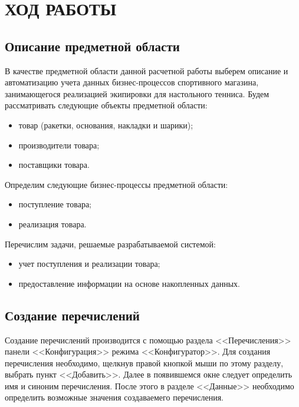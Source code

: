 \section[Ход работы]{ХОД РАБОТЫ}

\subsection{Описание предметной области}

В качестве предметной области данной расчетной работы выберем
описание и автоматизацию учета данных бизнес-процессов спортивного магазина,
занимающегося реализацией экипировки для настольного тенниса.
Будем рассматривать следующие объекты предметной области:
\begin{itemize}
\item товар (ракетки, основания, накладки и шарики);
\item производители товара;
\item поставщики товара.
\end{itemize}

Определим следующие бизнес-процессы предметной области:
\begin{itemize}
\item поступление товара;
\item реализация товара.
\end{itemize}

Перечислим задачи, решаемые разрабатываемой системой:
\begin{itemize}
\item учет поступления и реализации товара;
\item предоставление информации на основе накопленных данных.
\end{itemize}

\subsection{Создание перечислений}

Создание перечислений производится с помощью раздела <<Перечисления>>
панели <<Конфигурация>> режима <<Конфигуратор>>.
Для создания перечисления необходимо, щелкнув правой кнопкой мыши по этому
разделу, выбрать пункт <<Добавить>>. Далее в появившемся окне
следует определить имя и синоним перечисления.
После этого в разделе <<Данные>> необходимо определить возможные значения
создаваемего перечисления.

